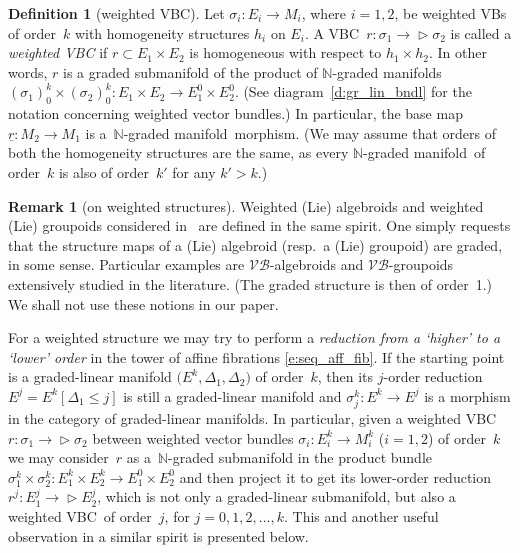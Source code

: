 \documentclass[pdftex]{sigma}
\newcommand{\grB}{{$\N$-graded manifold}}
\newcommand{\grBs}{{$\N$-graded manifolds}}
\newcommand{\ZM}{{VBC}} %
\newcommand{\degree}{{order}}
\newcommand{\N}{\mathbb{N}}
\newcommand{\und}{\underline}
\newcommand{\ra}{\rightarrow}
\newcommand{\VB}{\mathcal{VB}} %
\def\relto{\rightarrow\!\!\vartriangleright} %
\numberwithin{equation}{section}
\theoremstyle{definition}
\newtheorem{df}[thm]{Definition}
\newtheorem{rem}[thm]{Remark}
\begin{document}
\begin{df}[weighted \ZM ]\label{def:wZM} Let $\sigma_i\colon E_i\ra M_i$, where $i=1,2$, be weighted VBs of order~$k$ with homogeneity structures $h_i$ on $E_i$. A \ZM\ $r\colon \sigma_1\relto \sigma_2$ is called a \emph{weighted \ZM} if $r\subset E_1\times E_2$ is homogeneous with respect to $h_1\times h_2$. In other words, $r$ is a graded submanifold of the product of \grBs\ $(\sigma_1)^k_0 \times (\sigma_2)^k_0\colon E_1\times E_2 \ra E_1^0\times E_2^0$. (See diagram~\eqref{d:gr_lin_bndl} for the notation concerning weighted vector bundles.) In particular, the base map $\und{r}\colon M_2\ra M_1$ is a~\grB\ morphism. (We may assume that \degree s of both the homogeneity structures are the same, as every \grB\ of \degree\ $k$ is also of \degree\ ${k'}$ for any $k'>k$.)
\end{df}
\begin{rem}[on weighted structures] Weighted (Lie) algebroids and weighted (Lie) groupoids considered in~\cite{BGG} are defined in the same spirit. One simply requests that the structure maps of a (Lie) algebroid (resp.\ a (Lie) groupoid) are graded, in some sense. Particular examples are $\VB$-algebroids and $\VB$-groupoids extensively studied in the literature. (The graded structure is then of \degree\ 1.) We shall not use these notions in our paper.
\end{rem}

For a weighted structure we may try to perform a \emph{reduction from a `higher' to a `lower' order} in the tower of affine fibrations \eqref{e:seq_aff_fib}. If the starting point is a graded-linear manifold $\big(E^k, \Delta_1, \Delta_2\big)$ of \degree\ $k$, then its $j$-order reduction $E^j = E^k[\Delta_1\leq j]$ is still a graded-linear manifold and $\sigma^k_j\colon E^k\ra E^j$ is a morphism in the category of graded-linear manifolds.
In particular, given a weighted \ZM\ $r\colon \sigma_1 \relto \sigma_2$ between weighted vector bundles $\sigma_i\colon E^k_i\ra M_i^k$ ($i=1,2$) of \degree\ $k$ we may consider~$r$ as a~$\N$-graded submanifold in the product bundle $\sigma_1^k\times \sigma_2^k\colon E^k_1 \times E^k_2 \ra E^0_1 \times E^0_2$ and then project it to get its lower-order reduction \mbox{$r^j\colon E^j_1 \relto E^j_2$}, which is not only a graded-linear submanifold, but also a weighted \ZM\ of \degree\ $j$, for $j=0, 1, 2, \ldots, k$. This and another useful observation in a similar spirit is presented below.
\end{document}
